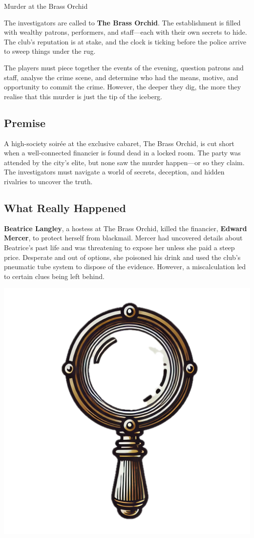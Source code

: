 
\begin{WyrdScenarioHeading}{Murder at the Brass Orchid}
	\raggedright
	
	The investigators are called to \textbf{The Brass Orchid}. The establishment is filled with wealthy patrons, performers, and staff—each with their own secrets to hide. The club’s reputation is at stake, and the clock is ticking before the police arrive to sweep things under the rug.

	The players must piece together the events of the evening, question patrons and staff, analyse the crime scene, and determine who had the means, motive, and opportunity to commit the crime. However, the deeper they dig, the more they realise that this murder is just the tip of the iceberg.

	\subsection*{Premise} 
	A high-society soirée at the exclusive cabaret, The Brass Orchid, is cut short when a well-connected financier is found dead in a locked room. The party was attended by the city's elite, but none saw the murder happen—or so they claim. The investigators must navigate a world of secrets, deception, and hidden rivalries to uncover the truth.

	\subsection*{What Really Happened} 
	\textbf{Beatrice Langley}, a hostess at The Brass Orchid, killed the financier, \textbf{Edward Mercer}, to protect herself from blackmail. Mercer had uncovered details about Beatrice’s past life and was threatening to expose her unless she paid a steep price. Desperate and out of options, she poisoned his drink and used the club’s pneumatic tube system to dispose of the evidence. However, a miscalculation led to certain clues being left behind.
\end{WyrdScenarioHeading}

\begin{center}
	\includegraphics[width=.5\linewidth]{img/separt/detective-glass}
\end{center}

